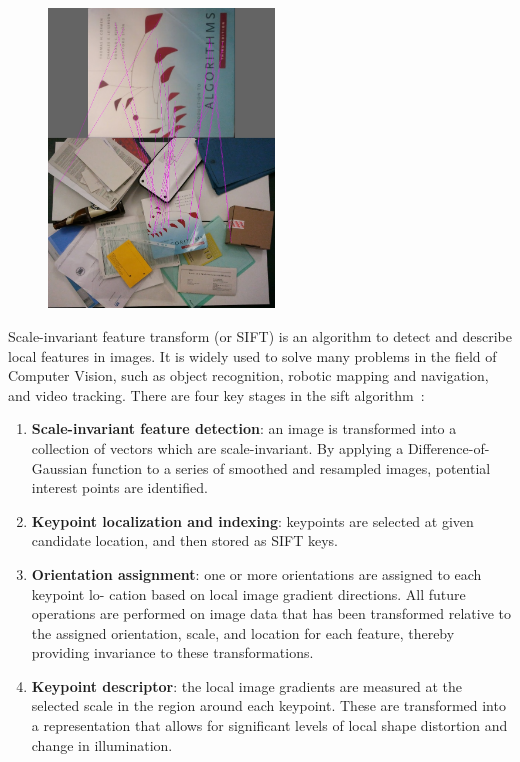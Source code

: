\documentclass[conference]{IEEEtran}
\begin{document}
\begin{figure}[htbp]
  \centering
\includegraphics[width=6cm]{experiments/book_sift/stacked.jpg}
\label{fig:sift_result}
\end{figure}
Scale-invariant feature transform (or SIFT) is an algorithm to detect
and describe local features in images.  It is widely used to solve
many problems in the field of Computer Vision, such as object
recognition, robotic mapping and navigation, and video tracking. There are four key stages in the sift algorithm~\cite{lowe2004distinctive}:
\begin{enumerate}
\item \textbf{Scale-invariant feature detection}: an image is transformed into
  a collection of vectors which are scale-invariant. By applying a Difference-of-Gaussian
function to a series of smoothed and resampled images, potential
interest points are identified.
\item \textbf{Keypoint localization and indexing}: keypoints are selected at given
  candidate location, and then stored as SIFT keys.
\item \textbf{Orientation assignment}:  one or more orientations are assigned to each keypoint lo-
cation based on local image gradient directions. All future operations are performed
on image data that has been transformed relative to the assigned orientation, scale, and
location for each feature, thereby providing invariance to these transformations.
\item \textbf{Keypoint descriptor}: the local image gradients are measured at the selected scale
in the region around each keypoint. These are transformed into a representation that
allows for significant levels of local shape distortion and change in illumination.
\end{enumerate}
\end{document}
